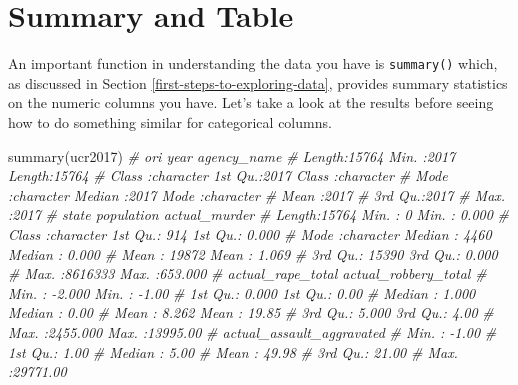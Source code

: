 \documentclass[
]{krantz}
\makeatletter
\newenvironment{Shaded}{\begin{snugshade}}{\end{snugshade}}
\newcommand{\CommentTok}[1]{\textcolor[rgb]{0.37,0.37,0.37}{\textit{#1}}}
\newcommand{\FunctionTok}[1]{\textcolor[rgb]{0,0,0}{#1}}
\newcommand{\NormalTok}[1]{#1}
\newenvironment{kframe}{%
\medskip{}
\setlength{\fboxsep}{.8em}
 \def\at@end@of@kframe{}%
 \ifinner\ifhmode%
  \def\at@end@of@kframe{\end{minipage}}%
  \begin{minipage}{\columnwidth}%
 \fi\fi%
 \def\FrameCommand##1{\hskip\@totalleftmargin \hskip-\fboxsep
 \colorbox{shadecolor}{##1}\hskip-\fboxsep
     \hskip-\linewidth \hskip-\@totalleftmargin \hskip\columnwidth}%
 \MakeFramed {\advance\hsize-\width
   \@totalleftmargin\z@ \linewidth\hsize
   \@setminipage}}%
 {\par\unskip\endMakeFramed%
 \at@end@of@kframe}
\renewenvironment{Shaded}{\begin{kframe}}{\end{kframe}}
\makeatother
\begin{document}
\hypertarget{summary-and-table}{%
\section{Summary and Table}\label{summary-and-table}}

An important function in understanding the data you have is
\texttt{summary()} which, as discussed in Section
\ref{first-steps-to-exploring-data}, provides summary
statistics on the numeric columns you have. Let's take a
look at the results before seeing how to do something
similar for categorical columns.

\begin{Shaded}
\begin{Highlighting}[]
\FunctionTok{summary}\NormalTok{(ucr2017)}
\CommentTok{\#      ori                 year      agency\_name       }
\CommentTok{\#  Length:15764       Min.   :2017   Length:15764      }
\CommentTok{\#  Class :character   1st Qu.:2017   Class :character  }
\CommentTok{\#  Mode  :character   Median :2017   Mode  :character  }
\CommentTok{\#                     Mean   :2017                     }
\CommentTok{\#                     3rd Qu.:2017                     }
\CommentTok{\#                     Max.   :2017                     }
\CommentTok{\#     state             population      actual\_murder    }
\CommentTok{\#  Length:15764       Min.   :      0   Min.   :  0.000  }
\CommentTok{\#  Class :character   1st Qu.:    914   1st Qu.:  0.000  }
\CommentTok{\#  Mode  :character   Median :   4460   Median :  0.000  }
\CommentTok{\#                     Mean   :  19872   Mean   :  1.069  }
\CommentTok{\#                     3rd Qu.:  15390   3rd Qu.:  0.000  }
\CommentTok{\#                     Max.   :8616333   Max.   :653.000  }
\CommentTok{\#  actual\_rape\_total  actual\_robbery\_total}
\CommentTok{\#  Min.   :  {-}2.000   Min.   :   {-}1.00    }
\CommentTok{\#  1st Qu.:   0.000   1st Qu.:    0.00    }
\CommentTok{\#  Median :   1.000   Median :    0.00    }
\CommentTok{\#  Mean   :   8.262   Mean   :   19.85    }
\CommentTok{\#  3rd Qu.:   5.000   3rd Qu.:    4.00    }
\CommentTok{\#  Max.   :2455.000   Max.   :13995.00    }
\CommentTok{\#  actual\_assault\_aggravated}
\CommentTok{\#  Min.   :   {-}1.00         }
\CommentTok{\#  1st Qu.:    1.00         }
\CommentTok{\#  Median :    5.00         }
\CommentTok{\#  Mean   :   49.98         }
\CommentTok{\#  3rd Qu.:   21.00         }
\CommentTok{\#  Max.   :29771.00}
\end{Highlighting}
\end{Shaded}
\end{document}

